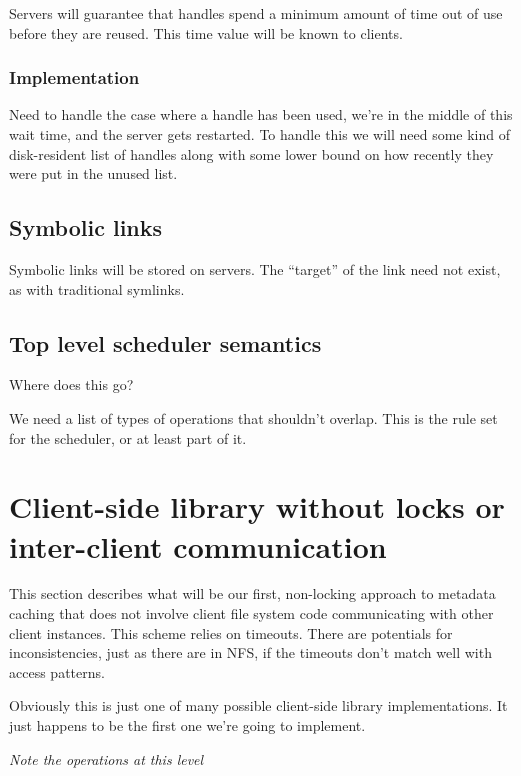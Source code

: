 \documentclass[10pt]{article} %
\begin{document}
Servers will guarantee that handles spend a minimum amount of time out of use
before they are reused.  This time value will be known to clients.

\subsubsection{Implementation}

Need to handle the case where a handle has been used, we're in the middle of
this wait time, and the server gets restarted.  To handle this we will need
some kind of disk-resident list of handles along with some lower bound on how
recently they were put in the unused list.

\subsection{Symbolic links}

Symbolic links will be stored on servers.  The ``target'' of the link need not
exist, as with traditional symlinks.

\subsection{Top level scheduler semantics}

Where does this go?

We need a list of types of operations that shouldn't overlap.  This is the
rule set for the scheduler, or at least part of it.



%
%
\section{Client-side library without locks or inter-client communication}

This section describes what will be our first, non-locking approach to
metadata caching that does not involve client file system code communicating
with other client instances.  This scheme relies on timeouts.  There are
potentials for inconsistencies, just as there are in NFS, if the timeouts
don't match well with access patterns.

Obviously this is just one of many possible client-side library
implementations.  It just happens to be the first one we're going to implement.

\emph{Note the operations at this level}
\end{document}
